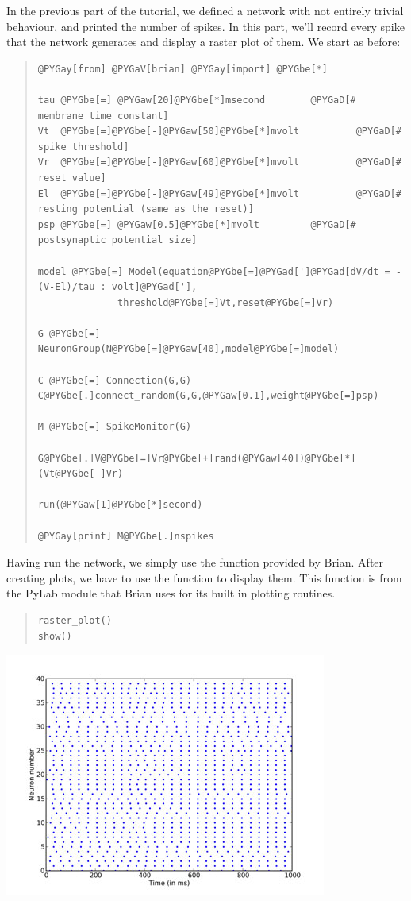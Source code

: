 \documentclass[letterpaper,10pt]{manual}
\begin{document}
In the previous part of the tutorial, we defined a network with
not entirely trivial behaviour, and printed the number of spikes.
In this part, we'll record every spike that the network generates
and display a raster plot of them. We start as before:
\begin{quote}

\begin{Verbatim}[commandchars=@\[\]]
@PYGay[from] @PYGaV[brian] @PYGay[import] @PYGbe[*]

tau @PYGbe[=] @PYGaw[20]@PYGbe[*]msecond        @PYGaD[# membrane time constant]
Vt  @PYGbe[=]@PYGbe[-]@PYGaw[50]@PYGbe[*]mvolt          @PYGaD[# spike threshold]
Vr  @PYGbe[=]@PYGbe[-]@PYGaw[60]@PYGbe[*]mvolt          @PYGaD[# reset value]
El  @PYGbe[=]@PYGbe[-]@PYGaw[49]@PYGbe[*]mvolt          @PYGaD[# resting potential (same as the reset)]
psp @PYGbe[=] @PYGaw[0.5]@PYGbe[*]mvolt         @PYGaD[# postsynaptic potential size]

model @PYGbe[=] Model(equation@PYGbe[=]@PYGad[']@PYGad[dV/dt = -(V-El)/tau : volt]@PYGad['],
              threshold@PYGbe[=]Vt,reset@PYGbe[=]Vr)

G @PYGbe[=] NeuronGroup(N@PYGbe[=]@PYGaw[40],model@PYGbe[=]model)

C @PYGbe[=] Connection(G,G)
C@PYGbe[.]connect_random(G,G,@PYGaw[0.1],weight@PYGbe[=]psp)

M @PYGbe[=] SpikeMonitor(G)

G@PYGbe[.]V@PYGbe[=]Vr@PYGbe[+]rand(@PYGaw[40])@PYGbe[*](Vt@PYGbe[-]Vr)

run(@PYGaw[1]@PYGbe[*]second)

@PYGay[print] M@PYGbe[.]nspikes
\end{Verbatim}
\end{quote}

Having run the network, we simply use the \hyperlink{brian.raster_plot}{} function
provided by Brian. After creating plots, we have to use the
 function to display them. This function is from the
PyLab module that Brian uses for its built in plotting
routines.
\begin{quote}

\begin{Verbatim}[commandchars=@\[\]]
raster_plot()
show()
\end{Verbatim}
\end{quote}

\includegraphics{1f.jpg}
\end{document}
